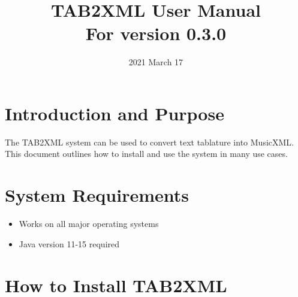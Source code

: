 \documentclass[11pt]{article}
\date{2021 March 17}
\title{TAB2XML User Manual\\\medskip
\large For version 0.3.0}
\begin{document}
\maketitle
\tableofcontents

\newpage

\section{Introduction and Purpose}
\label{sec:org66df310}
The TAB2XML system can be used to convert text tablature into MusicXML.  This document outlines how to install and use the system in many use cases.
\section{System Requirements}
\label{sec:org9340870}
\begin{itemize}
\item Works on all major operating systems
\item Java version 11-15 required
\end{itemize}
\section{How to Install TAB2XML}
\label{sec:org402d2bc}
\end{document}
